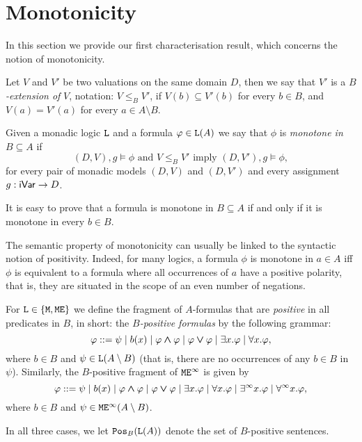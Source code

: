 
\section{Monotonicity}
\label{sec-mono}

In this section we provide our first characterisation result, which concerns the
notion of monotonicity. 

\begin{definition}\label{def:mono}
Let $V$ and $V'$ be two valuations on the same domain $D$, then we say that $V'$
is a \emph{$B$-extension of} $V$, notation: $V \leq_{B} V'$, if $V(b) \subseteq
V'(b)$ for every $b \in B$, and $V(a) = V'(a)$ for every $a \in A \setminus B$.

Given a monadic logic $\llang$ and a formula $\phi \in \llang(A)$ we say 
that $\phi$ is \emph{monotone in $B \subseteq A$} if 
\begin{equation}
\label{eq:mono}
(D,V),g \models \phi \text{ and } V \leq_{B} V' \text{ imply } 
(D,V'),g \models \phi,
\end{equation}
for every pair of monadic models $(D,V)$ and $(D,V')$ and every assignment 
$g:\fovar\to D$.
\end{definition}

\begin{remark}\label{rem:monotprodeach}
It is easy to prove that a formula is monotone in $B \subseteq A$ if and only if 
it is monotone in every $b \in B$. 
\end{remark}

The semantic property of monotonicity can usually be linked to the syntactic 
notion of positivity.
Indeed, for many logics, a formula $\phi$ is monotone in $a \in A$ iff 
$\phi$ is equivalent to a formula where all occurrences of $a$ have a positive
polarity, that is, they are situated in the scope of an even number of 
negations.

\begin{definition}
For $\llang \in \{ \ofo, \ofoe \}$ we define the fragment of $A$-formulas that 
are \emph{positive} in all predicates in $B$, in short: the \emph{$B$-positive 
formulas} by the following grammar:
\[
\phi \defbnf  \psi \mid b(x) 
  \mid \phi \land \phi \mid \phi \lor \phi
  \mid \exists x.\phi \mid \forall x.\phi, 
\]
where $b \in B$ and $\psi \in \llang(A\setminus B)$ (that is, there are no 
occurrences of any $b \in B$ in $\psi$).
Similarly, the $B$-positive fragment of $\ofoei$ is given by
\[
\phi \defbnf  \psi \mid b(x) 
  \mid \phi \land \phi \mid \phi \lor \phi
  \mid \exists x.\phi \mid \forall x.\phi 
  \mid \qu x.\phi \mid \dqu x.\phi, 
\]
where $b\in B$ and $\psi \in \ofoei(A\setminus B)$. 

In all three cases, we let $\monot{\llang(A)}{B}$ denote the set of $B$-positive
sentences.
\end{definition}

